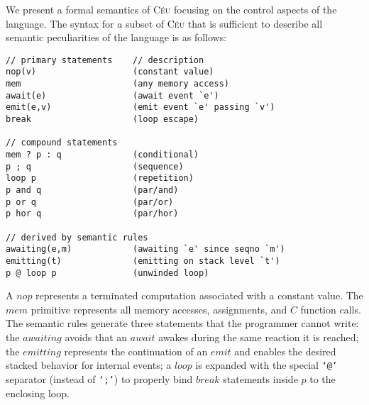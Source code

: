 \documentclass{acm_proc_article-sp}
\newcommand{\CEU}{\textsc{C\'{e}u}\xspace}
\newcommand{\code}[1] {{\small{\texttt{#1}}}}
\newcommand{\1}{\;}
\newcommand{\2}{\;\;}
\newcommand{\3}{\;\;\;}
\newcommand{\5}{\;\;\;\;\;}
\begin{document}
We present a formal semantics of \CEU focusing on the control aspects of the 
language.
%
%
The syntax for a subset of \CEU that is sufficient to describe all semantic 
peculiarities of the language is as follows:
%
{\small
\begin{verbatim}
// primary statements    // description
nop(v)                   (constant value)
mem                      (any memory access)
await(e)                 (await event `e')
emit(e,v)                (emit event `e' passing `v')
break                    (loop escape)

// compound statements
mem ? p : q              (conditional)
p ; q                    (sequence)
loop p                   (repetition)
p and q                  (par/and)
p or q                   (par/or)
p hor q                  (par/hor)

// derived by semantic rules
awaiting(e,m)            (awaiting `e' since seqno `m')
emitting(t)              (emitting on stack level `t')
p @ loop p               (unwinded loop)
\end{verbatim}
}%
%
A $nop$ represents a terminated computation associated with a constant value.
The $mem$ primitive represents all memory accesses, assignments, and $C$ 
function calls.
%
%
The semantic rules generate three statements that the programmer cannot write:
the $awaiting$ avoids that an $await$ awakes during the same reaction it is 
reached;
the $emitting$ represents the continuation of an $emit$ and enables the desired 
stacked behavior for internal events;
a $loop$ is expanded with the special \code{`@'} separator (instead of 
\code{`;'}) to properly bind $break$ statements inside $p$ to the enclosing 
loop.

\end{document}

